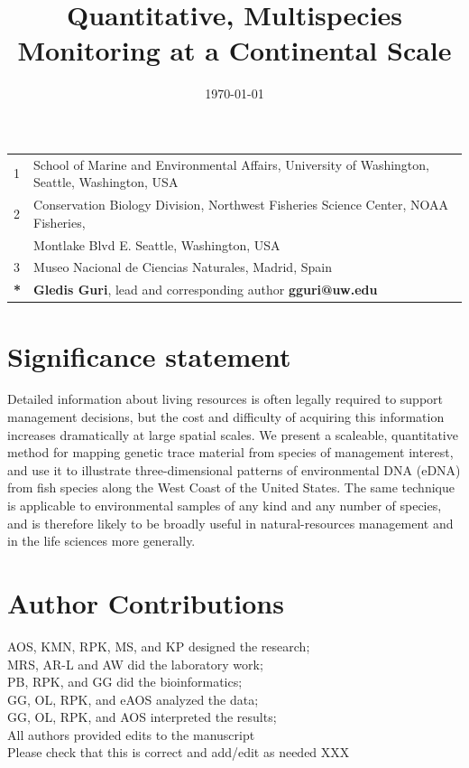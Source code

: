 \documentclass{article}
\title{Quantitative, Multispecies Monitoring at a Continental Scale}
\author{Gledis Guri$^1$\textbf{*} \and
Owen Liu$^2$ \and
Ryan P. Kelly$^1$ \and
Megan R. Shaffer$^1$\and
Kim Parsons$^2$ \and
Ana Ram\'on-Laca$^{1,2,3}$ \and
Krista M. Nichols$^2$ \and
Pedro F. P. Brandão-Dias$^1$ \and
Abigail Wells$^2$ \and
Andrew Olaf Shelton$^2$ \and}
\date{\today}
\begin{document}
\maketitle

\section*{}

\begin{center}
\begin{tabular}{ll}
1 & School of Marine and Environmental Affairs, University of Washington, Seattle, Washington, USA \\
2 & Conservation Biology Division, Northwest Fisheries Science Center,  NOAA Fisheries, \\
 & \qquad 2715 Montlake Blvd E. Seattle, Washington, USA \\
3 & Museo Nacional de Ciencias Naturales, Madrid, Spain \\
\hline
\textbf{*} & \textbf{Gledis Guri}, lead and corresponding author \textbf{gguri@uw.edu}
\end{tabular}
\end{center}

\section*{Significance statement}
Detailed information about living resources is often legally required to support management decisions, but the cost and difficulty of acquiring this information increases dramatically at large spatial scales. We present a scaleable, quantitative method for mapping genetic trace material from species of management interest, and use it to illustrate three-dimensional patterns of environmental DNA (eDNA) from fish species along the West Coast of the United States. The same technique is applicable to environmental samples of any kind and any number of species, and is therefore likely to be broadly useful in natural-resources management and in the life sciences more generally.

\section*{Author Contributions}
AOS, KMN, RPK, MS, and KP designed the research;\\
MRS, AR-L and AW did the laboratory work; \\
PB, RPK, and GG did the bioinformatics;\\
GG, OL, RPK, and eAOS analyzed the data;\\
GG, OL, RPK, and AOS interpreted the results;\\
All authors provided edits to the manuscript \\
Please check that this is correct and add/edit as needed XXX
\end{document}
